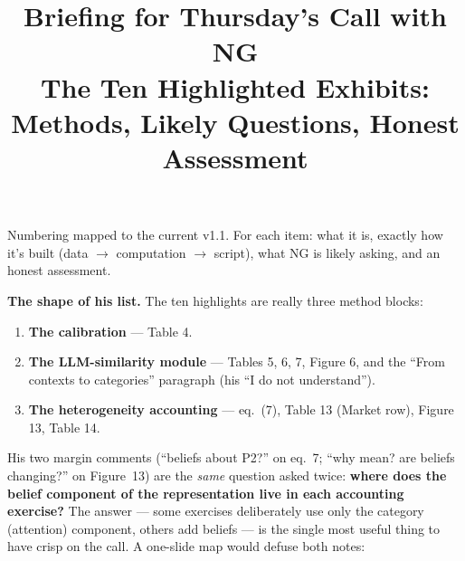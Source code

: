 \documentclass[11pt]{article}
\title{\textbf{Briefing for Thursday's Call with NG\\[2pt] \large The Ten Highlighted Exhibits: Methods, Likely Questions, Honest Assessment}}
\newcommand{\code}[1]{\path{#1}}
\begin{document}
\maketitle

Numbering mapped to the current v1.1. For each item: what it is, exactly how it's built (data $\to$ computation $\to$ script), what NG is likely asking, and an honest assessment.



\textbf{The shape of his list.} The ten highlights are really three method blocks:
\begin{enumerate}
\item \textbf{The calibration} --- Table 4.
\item \textbf{The LLM-similarity module} --- Tables 5, 6, 7, Figure 6, and the ``From contexts to categories'' paragraph (his ``I do not understand'').
\item \textbf{The heterogeneity accounting} --- eq.~(7), Table 13 (Market row), Figure 13, Table 14.
\end{enumerate}

His two margin comments (``beliefs about P2?'' on eq.~7; ``why mean? are beliefs changing?'' on Figure~13) are the \emph{same} question asked twice: \textbf{where does the belief component of the representation live in each accounting exercise?} The answer --- some exercises deliberately use only the category (attention) component, others add beliefs --- is the single most useful thing to have crisp on the call. A one-slide map would defuse both notes:
\end{document}
